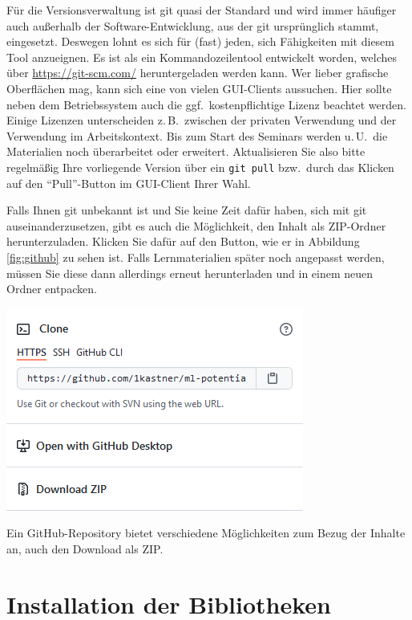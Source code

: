 \documentclass{tufte-handout}
\begin{document}
Für die Versionsverwaltung ist git quasi der Standard und wird immer häufiger auch außerhalb der Software-Entwicklung, aus der git ursprünglich stammt, eingesetzt.
Deswegen lohnt es sich für (fast) jeden, sich Fähigkeiten mit diesem Tool anzueignen.
Es ist als ein Kommandozeilentool entwickelt worden, welches über \url{https://git-scm.com/} heruntergeladen werden kann.
Wer lieber grafische Oberflächen mag, kann sich eine von vielen GUI-Clients%
aussuchen.
Hier sollte neben dem Betriebssystem auch die ggf.\ kostenpflichtige Lizenz beachtet werden.
Einige Lizenzen unterscheiden z.\,B.\ zwischen der privaten Verwendung und der Verwendung im Arbeitskontext.
Bis zum Start des Seminars werden u.\,U.\ die Materialien noch überarbeitet oder erweitert.
Aktualisieren Sie also bitte regelmäßig Ihre vorliegende Version über ein \texttt{git pull} bzw.\ durch das Klicken auf den \enquote{Pull}-Button im GUI-Client Ihrer Wahl.

Falls Ihnen git unbekannt ist und Sie keine Zeit dafür haben, sich mit git auseinanderzusetzen, gibt es auch die Möglichkeit, den Inhalt als ZIP-Ordner herunterzuladen.
Klicken Sie dafür auf den Button, wie er in Abbildung\,\ref{fig:github} zu sehen ist.
Falls Lernmaterialien später noch angepasst werden, müssen Sie diese dann allerdings erneut herunterladen und in einem neuen Ordner entpacken.

\begin{marginfigure}
  \includegraphics{github-zip}
  \caption{Ein GitHub-Repository bietet verschiedene Möglichkeiten zum Bezug der Inhalte an, auch den Download als ZIP.}%
\label{fig:github}
\end{marginfigure}


\section{Installation der Bibliotheken}
\end{document}
